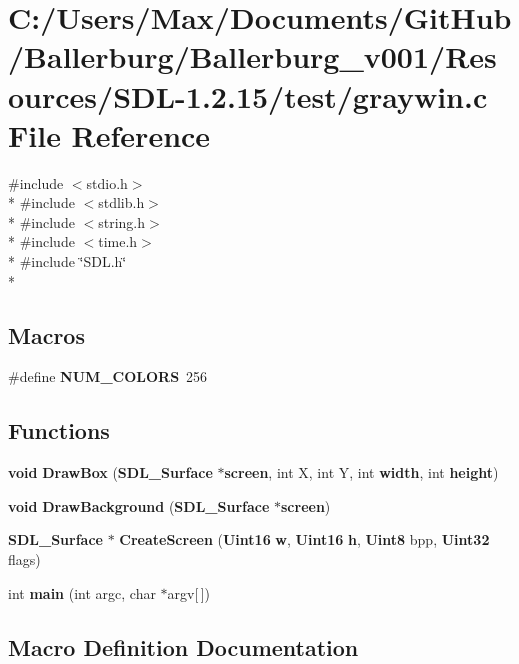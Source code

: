\section{C\+:/\+Users/\+Max/\+Documents/\+Git\+Hub/\+Ballerburg/\+Ballerburg\+\_\+v001/\+Resources/\+S\+D\+L-\/1.2.15/test/graywin.c File Reference}
\label{graywin_8c}
{\ttfamily \#include $<$stdio.\+h$>$}\\*
{\ttfamily \#include $<$stdlib.\+h$>$}\\*
{\ttfamily \#include $<$string.\+h$>$}\\*
{\ttfamily \#include $<$time.\+h$>$}\\*
{\ttfamily \#include \char`\"{}S\+D\+L.\+h\char`\"{}}\\*
\subsection*{Macros}
\begin{DoxyCompactItemize}
\item 
\#define {\bf N\+U\+M\+\_\+\+C\+O\+L\+O\+R\+S}~256
\end{DoxyCompactItemize}
\subsection*{Functions}
\begin{DoxyCompactItemize}
\item 
{\bf void} {\bf Draw\+Box} ({\bf S\+D\+L\+\_\+\+Surface} $\ast${\bf screen}, int X, int Y, int {\bf width}, int {\bf height})
\item 
{\bf void} {\bf Draw\+Background} ({\bf S\+D\+L\+\_\+\+Surface} $\ast${\bf screen})
\item 
{\bf S\+D\+L\+\_\+\+Surface} $\ast$ {\bf Create\+Screen} ({\bf Uint16} {\bf w}, {\bf Uint16} {\bf h}, {\bf Uint8} bpp, {\bf Uint32} flags)
\item 
int {\bf main} (int argc, char $\ast$argv[$\,$])
\end{DoxyCompactItemize}


\subsection{Macro Definition Documentation}
